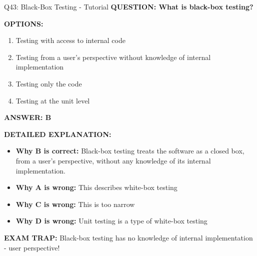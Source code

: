 \documentclass[8pt]{beamer}
\begin{document}
	\begin{frame}{Q43: Black-Box Testing - Tutorial}
		\fontsize{6.5}{7.5}\selectfont
		\textbf{QUESTION: What is black-box testing?}
		
		\vspace{0.1cm}
		\textbf{OPTIONS:}
		\begin{enumerate}
			\item Testing with access to internal code
			\item Testing from a user's perspective without knowledge of internal implementation
			\item Testing only the code
			\item Testing at the unit level
		\end{enumerate}
		
		\vspace{0.1cm}
		\textcolor{myblue}{\textbf{ANSWER: B}}
		
		\vspace{0.1cm}
		\textbf{DETAILED EXPLANATION:}
		\begin{itemize}
			\item \textbf{Why B is correct:} Black-box testing treats the software as a closed box, from a user's perspective, without any knowledge of its internal implementation.
			\item \textbf{Why A is wrong:} This describes white-box testing
			\item \textbf{Why C is wrong:} This is too narrow
			\item \textbf{Why D is wrong:} Unit testing is a type of white-box testing
		\end{itemize}
		
		\textcolor{myred}{\textbf{EXAM TRAP:}} Black-box testing has \textcolor{myblue}{no knowledge of internal implementation} - user perspective!
	\end{frame}
	
\end{document}
